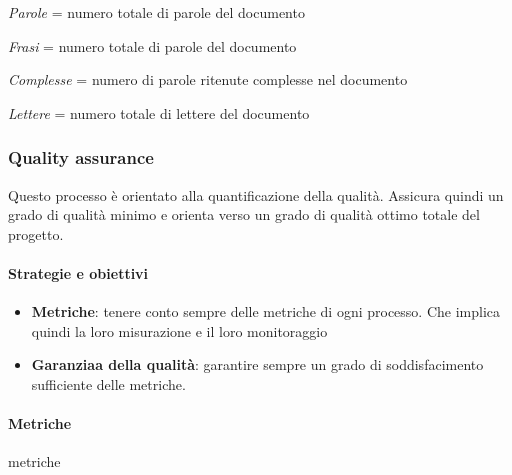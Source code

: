              \def\productquality{
                            {   Gunning's fog index,
                                $0.4*(\frac{ Parole}{Frasi} + 100* \frac{Complesse}{ Frasi})$, 
                                $ \geq 16$,
                                $ \geq 12 $
                            },
                            {   Gulpease index,
                                $89 + (300*Frasi - 10*\frac{Lettere}{Parole}$, 
                                $40 < IG \leq 100$,
                                $80 < IG \leq 100$
                            },
                            {   Correttezza ortografica,
                                numero totale di errori, 
                                0,
                                0
                            },
                        }


\textit{Parole} = numero totale di parole del documento

\textit{Frasi} = numero totale di parole del documento

\textit{Complesse} = numero di parole ritenute complesse nel documento

\textit{Lettere} = numero totale di lettere del documento
            
            \subsubsection{Quality assurance}
            Questo processo è orientato alla quantificazione della qualità. Assicura quindi un grado di qualità minimo e orienta verso un grado di qualità ottimo totale del progetto.
            
            \paragraph{Strategie e obiettivi}
            \begin{itemize}
                \item \textbf{Metriche}: tenere conto sempre delle metriche di ogni processo. Che implica quindi la loro misurazione e il loro monitoraggio
                \item \textbf{Garanziaa della qualità}: garantire sempre un grado di soddisfacimento sufficiente delle metriche.
            \end{itemize}
            
            \paragraph{Metriche}
            metriche
            \def\productquality{
                {   Percentuale di metriche soddisfatte,
                    $\frac{Soddisfatte}{Totali}$,
                    $ \geq 60 \%$,
                    $ \geq 80 \% $
                },
            }


